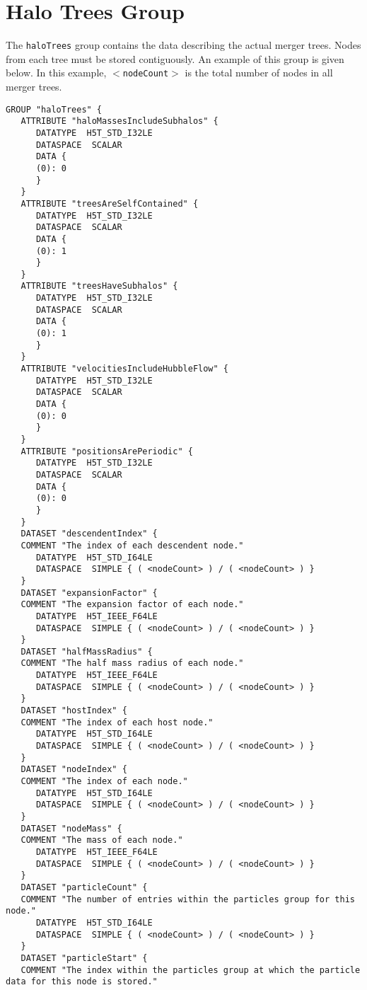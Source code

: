 \section{Halo Trees Group}\label{sec:HaloTreesGroup}

The {\tt haloTrees} group contains the data describing the actual merger trees. Nodes from each tree must be stored contiguously. An example of this group is given below. In this example, {\tt $<$nodeCount$>$} is the total number of nodes in all merger trees.

\begin{verbatim}
GROUP "haloTrees" {
   ATTRIBUTE "haloMassesIncludeSubhalos" {
      DATATYPE  H5T_STD_I32LE
      DATASPACE  SCALAR
      DATA {
      (0): 0
      }
   }
   ATTRIBUTE "treesAreSelfContained" {
      DATATYPE  H5T_STD_I32LE
      DATASPACE  SCALAR
      DATA {
      (0): 1
      }
   }
   ATTRIBUTE "treesHaveSubhalos" {
      DATATYPE  H5T_STD_I32LE
      DATASPACE  SCALAR
      DATA {
      (0): 1
      }
   }
   ATTRIBUTE "velocitiesIncludeHubbleFlow" {
      DATATYPE  H5T_STD_I32LE
      DATASPACE  SCALAR
      DATA {
      (0): 0
      }
   }
   ATTRIBUTE "positionsArePeriodic" {
      DATATYPE  H5T_STD_I32LE
      DATASPACE  SCALAR
      DATA {
      (0): 0
      }
   }
   DATASET "descendentIndex" {
   COMMENT "The index of each descendent node."
      DATATYPE  H5T_STD_I64LE
      DATASPACE  SIMPLE { ( <nodeCount> ) / ( <nodeCount> ) }
   }
   DATASET "expansionFactor" {
   COMMENT "The expansion factor of each node."
      DATATYPE  H5T_IEEE_F64LE
      DATASPACE  SIMPLE { ( <nodeCount> ) / ( <nodeCount> ) }
   }
   DATASET "halfMassRadius" {
   COMMENT "The half mass radius of each node."
      DATATYPE  H5T_IEEE_F64LE
      DATASPACE  SIMPLE { ( <nodeCount> ) / ( <nodeCount> ) }
   }
   DATASET "hostIndex" {
   COMMENT "The index of each host node."
      DATATYPE  H5T_STD_I64LE
      DATASPACE  SIMPLE { ( <nodeCount> ) / ( <nodeCount> ) }
   }
   DATASET "nodeIndex" {
   COMMENT "The index of each node."
      DATATYPE  H5T_STD_I64LE
      DATASPACE  SIMPLE { ( <nodeCount> ) / ( <nodeCount> ) }
   }
   DATASET "nodeMass" {
   COMMENT "The mass of each node."
      DATATYPE  H5T_IEEE_F64LE
      DATASPACE  SIMPLE { ( <nodeCount> ) / ( <nodeCount> ) }
   }
   DATASET "particleCount" {
   COMMENT "The number of entries within the particles group for this node."
      DATATYPE  H5T_STD_I64LE
      DATASPACE  SIMPLE { ( <nodeCount> ) / ( <nodeCount> ) }
   }
   DATASET "particleStart" {
   COMMENT "The index within the particles group at which the particle data for this node is stored."

\end{verbatim}

